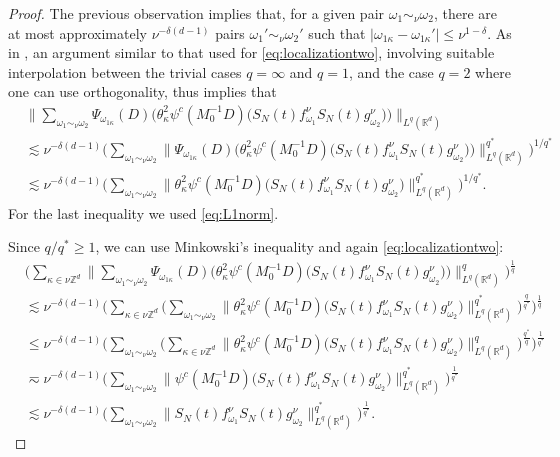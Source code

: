 \documentclass{amsart}
\numberwithin{equation}{section}
\theoremstyle{definition}
\newcommand{\Rd}{\mathbb{R}^{d}}
\newcommand{\Z}{\mathbb{Z}}
\newcommand {\ka}{\kappa}
\newcommand {\w}{\omega}
\begin{document}
\begin{proof}
The previous observation implies that, for a given pair $\w_{1}\sim_{\nu}\w_{2}$, there are at most approximately $\nu^{-\delta(d-1)}$ pairs $\w_{1}'\sim_{\nu}\w_{2}'$ such that $|\w_{1\ka}-\w_{1\ka}'|\leq \nu^{1-\delta}$. As in \cite[Lemma 7.1]{TaoVargas2000}, an argument similar to that used for \eqref{eq:localizationtwo}, involving suitable interpolation between the trivial cases $q=\infty$ and $q=1$, and the case $q=2$ where one can use orthogonality, thus implies that 
\begin{align*}
&\Big\|\sum_{\w_{1}\sim_{\nu}\w_{2}}\Psi_{\w_{1\ka}}(D)\big(\theta^2_{\ka}\psi^c(M_{0}^{-1}D)\big(S_{N}(t)f^{\nu}_{\w_{1}}S_{N}(t)g^{\nu}_{\w_{2}}\big)\big)\Big\|_{L^{q}(\Rd)}\\
&\lesssim \nu^{-\delta(d-1)}\Big(\sum_{\w_{1}\sim_{\nu}\w_{2}}\big\|\Psi_{\w_{1\ka}}(D)\big(\theta^2_{\ka}\psi^c(M_{0}^{-1}D)\big(S_{N}(t)f^{\nu}_{\w_{1}}S_{N}(t)g^{\nu}_{\w_{2}}\big)\big)\big\|_{L^{q}(\Rd)}^{q^{*}}\Big)^{1/q^{*}}\\
&\lesssim \nu^{-\delta(d-1)}\Big(\sum_{\w_{1}\sim_{\nu}\w_{2}}\|\theta^2_{\ka}\psi^c(M_{0}^{-1}D)\big(S_{N}(t)f^{\nu}_{\w_{1}}S_{N}(t)g^{\nu}_{\w_{2}}\big)\|_{L^{q}(\Rd)}^{q^{*}}\Big)^{1/q^{*}}.
\end{align*}
For the last inequality we used \eqref{eq:L1norm}.

Since $q/q^{*}\geq 1$, we can use Minkowski's inequality and again \eqref{eq:localizationtwo}:
\begin{align*}
&\Big(\sum_{\ka\in\nu\Z^{d}}\Big\|\sum_{\w_{1}\sim_{\nu}\w_{2}}\Psi_{\w_{1\ka}}(D)\big(\theta_{\ka}^2 \psi^c(M_{0}^{-1}D)\big(S_{N}(t)f^{\nu}_{\w_{1}}S_{N}(t)g^{\nu}_{\w_{2}}\big)\big)\Big\|_{L^{q}(\Rd)}^{q}\Big)^{\frac{1}{q}}\\
&\lesssim \nu^{-\delta(d-1)}\Big(\sum_{\ka\in\nu\Z^{d}}\Big(\sum_{\w_{1}\sim_{\nu}\w_{2}}\|\theta_{\ka}^2 \psi^c(M_{0}^{-1}D)\big(S_{N}(t)f^{\nu}_{\w_{1}}S_{N}(t)g^{\nu}_{\w_{2}}\big)\|_{L^{q}(\Rd)}^{q^{*}}\Big)^{\frac{q}{q^{*}}}\Big)^{\frac{1}{q}}\\
&\leq \nu^{-\delta(d-1)}\Big(\sum_{\w_{1}\sim_{\nu}\w_{2}}\Big(\sum_{\ka\in\nu\Z^{d}}\|\theta_{\ka}^2 \psi^c(M_{0}^{-1}D) \big(S_{N}(t)f^{\nu}_{\w_{1}}S_{N}(t)g^{\nu}_{\w_{2}}\big)\|_{L^{q}(\Rd)}^{q}\Big)^{\frac{q^{*}}{q}}\Big)^{\frac{1}{q^{*}}}\\
&\eqsim \nu^{-\delta(d-1)}\Big(\sum_{\w_{1}\sim_{\nu}\w_{2}}\|\psi^c(M_{0}^{-1}D) \big(S_{N}(t)f^{\nu}_{\w_{1}}S_{N}(t)g^{\nu}_{\w_{2}}\big)\|_{L^{q}(\Rd)}^{q^{*}}\Big)^{\frac{1}{q^{*}}}\\
&\lesssim \nu^{-\delta(d-1)}\Big(\sum_{\w_{1}\sim_{\nu}\w_{2}}\|S_{N}(t)f^{\nu}_{\w_{1}}S_{N}(t)g^{\nu}_{\w_{2}}\|_{L^{q}(\Rd)}^{q^{*}}\Big)^{\frac{1}{q^{*}}}.
\end{align*}


\end{proof}
\end{document}
